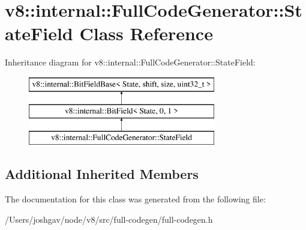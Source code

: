 \hypertarget{classv8_1_1internal_1_1_full_code_generator_1_1_state_field}{}\section{v8\+:\+:internal\+:\+:Full\+Code\+Generator\+:\+:State\+Field Class Reference}
\label{classv8_1_1internal_1_1_full_code_generator_1_1_state_field}
Inheritance diagram for v8\+:\+:internal\+:\+:Full\+Code\+Generator\+:\+:State\+Field\+:\begin{figure}[H]
\begin{center}
\leavevmode
\includegraphics[height=3.000000cm]{classv8_1_1internal_1_1_full_code_generator_1_1_state_field}
\end{center}
\end{figure}
\subsection*{Additional Inherited Members}


The documentation for this class was generated from the following file\+:\begin{DoxyCompactItemize}
\item 
/\+Users/joshgav/node/v8/src/full-\/codegen/full-\/codegen.\+h\end{DoxyCompactItemize}
